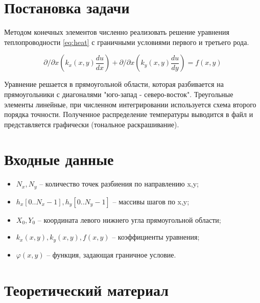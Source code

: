 \documentclass[a4paper, 14pt]{extarticle}
\begin{document}


\setcounter{page}{2} %
\renewcommand{\contentsname}{\hfill Содержание \hfill}
\renewcommand{\cftaftertoctitle}{\hfill}

\tableofcontents

\clearpage

\section{Постановка задачи}

Методом конечных элементов численно реализовать решение уравнения
теплопроводности \ref{eq:heat} с граничными условиями первого и третьего рода.

\begin{equation}
\partial/\partial x \left(k_x(x,y) \frac{du}{dx} \right) +
\partial/\partial x \left(k_y(x,y) \frac{du}{dy}\right) = f(x,y)
\end{equation} \label{eq:heat}

Уравнение решается в прямоугольной области, которая разбивается на
прямоугольники с диагоналями "юго-запад - северо-восток". Треугольные элементы
линейные, при численном интегрировании используется схема второго порядка
точности. Полученное распределение температуры выводится в файл и представляется
графически (тональное раскрашивание).

\clearpage

\section{Входные данные}

\begin{itemize}
	\item $N_x, N_y$ --  количество точек разбиения по направлению x,y;
	\item $h_x[0 .. N_x-1], h_y[0 .. N_y-1]$ -- массивы шагов по x,y;
	\item $X_0, Y_0$ -- координата левого нижнего угла прямоугольной области;
	\item $k_x(x,y), k_y(x,y), f(x,y)$ -- коэффициенты уравнения;
	\item $\varphi(x,y)$ -- функция, задающая граничное условие.
\end{itemize}

\clearpage
\section{Теоретический материал}
\end{document}
